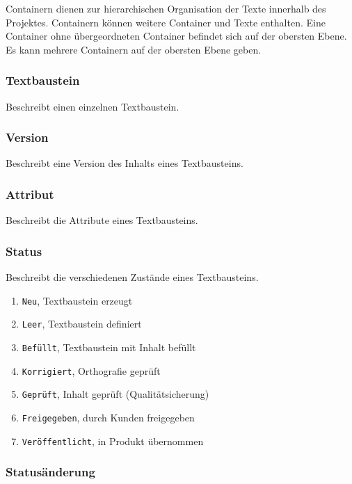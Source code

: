 Containern dienen zur hierarchischen Organisation der Texte innerhalb des Projektes. Containern können weitere Container und Texte enthalten. Eine Container ohne übergeordneten Container befindet sich auf der obersten Ebene. Es kann mehrere Containern auf der obersten Ebene geben.

\subsubsection{Textbaustein}\label{model:textbaustein}

Beschreibt einen einzelnen Textbaustein.

\subsubsection{Version}\label{model:version}

Beschreibt eine Version des Inhalts eines Textbausteins.

\subsubsection{Attribut}\label{model:attribut}

Beschreibt die Attribute eines Textbausteins.

\subsubsection{Status}\label{model:status}

Beschreibt die verschiedenen Zustände eines Textbausteins.

\begin{enumerate}\itemsep -5pt
\item \texttt{Neu}, Textbaustein erzeugt
\item \texttt{Leer}, Textbaustein definiert
\item \texttt{Befüllt}, Textbaustein mit Inhalt befüllt
\item \texttt{Korrigiert}, Orthografie geprüft
\item \texttt{Geprüft}, Inhalt geprüft (Qualitätsicherung)
\item \texttt{Freigegeben}, durch Kunden freigegeben
\item \texttt{Veröffentlicht}, in Produkt übernommen
\end{enumerate}

\subsubsection{Statusänderung}\label{model:statuschange}

